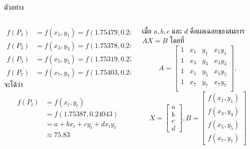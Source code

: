 \documentclass[12pt,aspectratio=169]{beamer}
\begin{document}
\begin{frame}{ตัวอย่าง}
        \begin{columns}
            \begin{column}{0.6\textwidth}
\begin{align*}
f(P_1) & = f(x_1,y_1) = f(1.75479, 0.24063) = 74, \\ 
f(P_3) & = f(x_3,y_3) = f(1.75378, 0.24084) = 63,\\
f(P_5) & = f(x_5,y_5) = f(1.75319, 0.23996) = 78,\\
f(P_7) & = f(x_7,y_7) = f(1.75403, 0.24010) = 89, 
\end{align*}
จะได้ว่า
            \begin{block}{}
            \vspace{-3mm}
              \begin{align*}
                 f(P_t) & = f(x_t,y_t) \\
                        & = f(1.75387, 0.24043)\\
                        & = a+bx_t+cy_t+dx_ty_t \\
                        & \approx 75.83
              \end{align*}  
            \end{block}

            \end{column}
            \begin{column}{0.35\textwidth} 

{\color{orange!90!black}%
เมื่อ $a,b,c$ และ $d$ คือผลเฉลยของสมการ $AX = B$  โดยที่              
            \[
               A
               =\begin{bmatrix}
               1 & x_1 & y_1 & x_1y_1\\
               1 & x_3 & y_3 & x_3y_3\\
               1 & x_5 & y_5 & x_5y_5\\
               1 & x_7 & y_7 & x_7y_7\\
               \end{bmatrix},
        \]
        \[
               X = \begin{bmatrix}
                  a \\ b \\ c \\ d
               \end{bmatrix}
               ,
               B
               =\begin{bmatrix}
                  f(x_1,y_1) \\
                  f(x_3,y_3) \\
                  f(x_5,y_5) \\
                  f(x_7,y_7)
               \end{bmatrix}
        \]
}
            \end{column}

            \end{columns}    
\end{frame}
\end{document}
